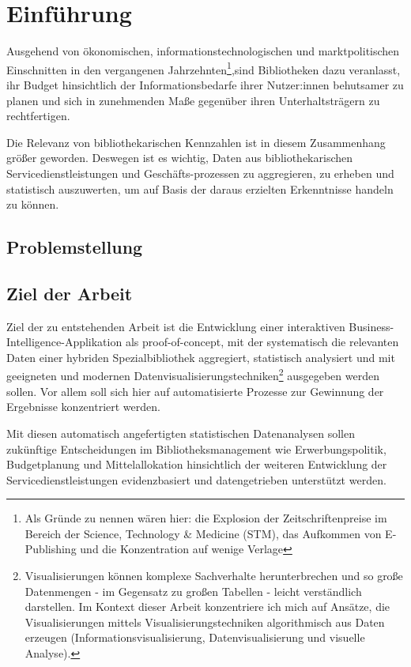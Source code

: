 \chapter{Einführung}
Ausgehend von ökonomischen, informationstechnologischen und marktpolitischen Einschnitten in den
vergangenen Jahrzehnten\footnote{Als Gründe zu nennen wären hier: die Explosion der Zeitschriftenpreise im Bereich der
Science, Technology \& Medicine (STM), das Aufkommen von E-Publishing und die Konzentration auf wenige
Verlage},sind Bibliotheken dazu veranlasst, ihr Budget hinsichtlich der Informationsbedarfe
ihrer Nutzer:innen behutsamer zu planen und sich in zunehmenden Maße gegenüber ihren Unterhaltsträgern zu rechtfertigen.

Die Relevanz von bibliothekarischen Kennzahlen ist in diesem Zusammenhang größer geworden.
Deswegen ist es wichtig, Daten aus bibliothekarischen Servicedienstleistungen und Geschäfts-prozessen zu aggregieren, zu erheben und statistisch
auszuwerten, um auf Basis der daraus erzielten Erkenntnisse handeln zu können.

\section{Problemstellung}

\section{Ziel der Arbeit}
Ziel der zu entstehenden Arbeit ist die Entwicklung einer
interaktiven Business-Intelligence-Applikation als proof-of-concept,
mit der systematisch die relevanten Daten einer hybriden Spezialbibliothek aggregiert, statistisch
analysiert und mit geeigneten und modernen Datenvisualisierungstechniken\footnote{Visualisierungen können komplexe Sachverhalte herunterbrechen und
so große Datenmengen - im Gegensatz zu großen Tabellen - leicht verständlich
darstellen. Im Kontext dieser Arbeit konzentriere ich mich auf Ansätze, die Visualisierungen mittels Visualisierungstechniken algorithmisch aus
Daten erzeugen (Informationsvisualisierung, Datenvisualisierung und visuelle Analyse).\cite{RN100}}
ausgegeben werden sollen.
Vor allem soll sich hier auf automatisierte Prozesse zur Gewinnung der Ergebnisse konzentriert werden.

Mit diesen automatisch angefertigten statistischen Datenanalysen sollen zukünftige
Entscheidungen im Bibliotheksmanagement wie Erwerbungspolitik, Budgetplanung und
Mittelallokation hinsichtlich der weiteren Entwicklung der
Servicedienstleistungen evidenzbasiert und datengetrieben unterstützt werden.

